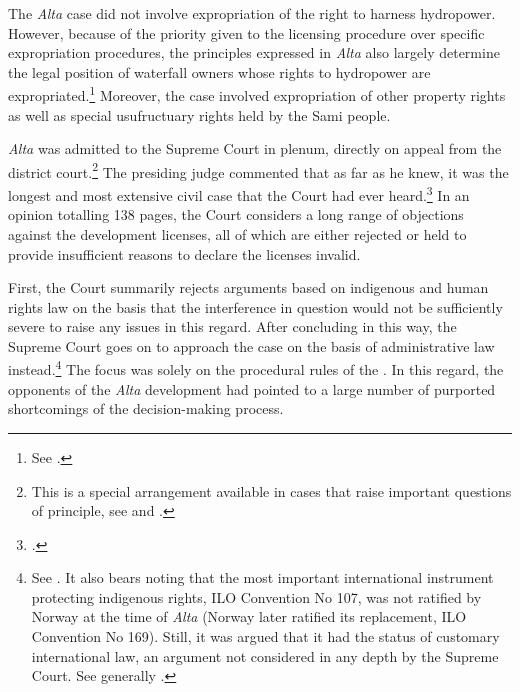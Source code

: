 The {\it Alta} case did not involve expropriation of the right to harness hydropower. However, because of the priority given to the licensing procedure over specific expropriation procedures, the principles expressed in {\it Alta} also largely determine the legal position of waterfall owners whose rights to hydropower are expropriated.\footnote{See \cite{sauda09,jorpeland11}.} Moreover, the case involved expropriation of other property rights as well as special usufructuary rights held by the Sami people.

{\it Alta} was admitted to the Supreme Court in plenum, directly on appeal from the district court.\footnote{This is a special arrangement available in cases that raise important questions of principle, see \cite[30-2]{cda05} and \cite[5]{ca15}.} The presiding judge commented that as far as he knew, it was the longest and most extensive civil case that the Court had ever heard.\footcite[254]{alta82} In an opinion totalling 138 pages, the Court considers a long range of objections against the development licenses, all of which are either rejected or held to provide insufficient reasons to declare the licenses invalid.


First, the Court summarily rejects arguments based on indigenous and human rights law on the basis that the interference in question would not be sufficiently severe to raise any issues in this regard. After concluding in this way, the Supreme Court goes on to approach the case on the basis of administrative law instead.\footnote{See \cite[351-352]{eckhoff82}. It also bears noting that the most important international instrument protecting indigenous rights, ILO Convention No 107, was not ratified by Norway at the time of {\it Alta} (Norway later ratified its replacement, ILO Convention No 169). Still, it was argued that it had the status of customary international law, an argument not considered in any depth by the Supreme Court. See generally \cite{eide80}.} The focus was solely on the procedural rules of the \cite{wra17}. In this regard, the opponents of the {\it Alta} development had pointed to a large number of purported shortcomings of the decision-making process. 

